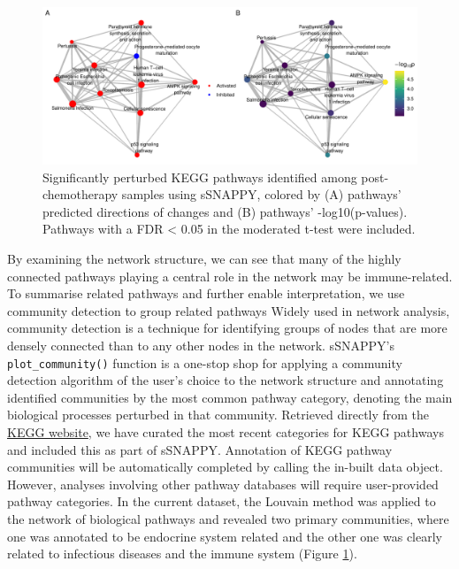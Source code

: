 \documentclass[9pt,a4paper,]{extarticle}
\begin{document}
\begin{figure}

{\centering \includegraphics[width=1\linewidth]{sSNAPPY_paper_files/figure-latex/Figure2-1} 

}

\caption{Significantly perturbed KEGG pathways identified among post-chemotherapy samples using sSNAPPY, colored by (A) pathways’ predicted directions of changes and (B) pathways’ -log10(p-values). Pathways with a FDR < 0.05 in the moderated t-test were included.}\label{fig:Figure2}
\end{figure}

By examining the network structure, we can see that many of the highly connected pathways playing a central role in the network may be immune-related.
To summarise related pathways and further enable interpretation, we use community detection to group related pathways
Widely used in network analysis, community detection is a technique for identifying groups of nodes that are more densely connected than to any other nodes in the network\citep{Newman2004}.
sSNAPPY's \texttt{plot\_community()} function is a one-stop shop for applying a community detection algorithm of the user's choice to the network structure and annotating identified communities by the most common pathway category, denoting the main biological processes perturbed in that community.
Retrieved directly from the \href{https://www.genome.jp/kegg/pathway.html}{KEGG website}, we have curated the most recent categories for KEGG pathways and included this as part of sSNAPPY.
Annotation of KEGG pathway communities will be automatically completed by calling the in-built data object.
However, analyses involving other pathway databases will require user-provided pathway categories.
In the current dataset, the Louvain method was applied to the network of biological pathways and revealed two primary communities, where one was annotated to be endocrine system related and the other one was clearly related to infectious diseases and the immune system (Figure \ref{fig:Figure2}).
\end{document}
